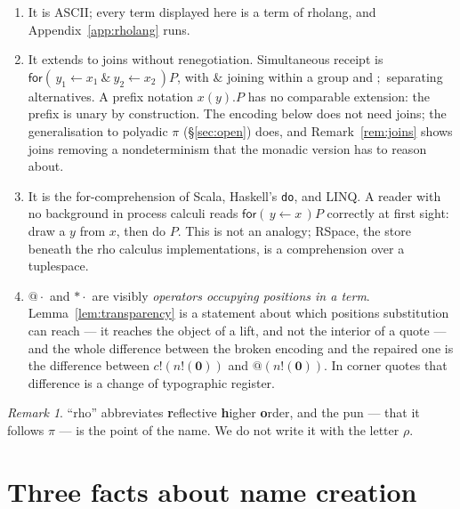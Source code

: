 \documentclass[11pt]{article}
\makeatletter
\theoremstyle{definition}
\theoremstyle{plain}
\theoremstyle{remark}
\newtheorem{remark}[definition]{Remark}
\newcommand{\quo}[1]{@#1}
\newcommand{\drp}[1]{{*}#1}
\newcommand{\inp}[3]{\mathsf{for}(\,#1 \leftarrow #2\,)#3}
\newcommand{\inpp}[5]{\mathsf{for}(\,#1 \leftarrow #2\ \&\ #3 \leftarrow #4\,)#5}
\newcommand{\out}[2]{#1!(#2)}
\newcommand{\nil}{\mathbf{0}}
\makeatother
\begin{document}
\begin{enumerate}[label=(\arabic*),leftmargin=2.2em]
\item It is ASCII; every term displayed here is a term of rholang, and
Appendix~\ref{app:rholang} runs.

\item It extends to joins without renegotiation. Simultaneous receipt is
$\inpp{y_1}{x_1}{y_2}{x_2}{P}$, with $\&$ joining within a group and $;$
separating alternatives. A prefix notation $x(y).P$ has no comparable
extension: the prefix is unary by construction. The encoding below does
not need joins; the generalisation to polyadic $\pi$
(\S\ref{sec:open}) does, and Remark~\ref{rem:joins} shows joins removing
a nondeterminism that the monadic version has to reason about.

\item It is the for-comprehension of Scala, Haskell's \texttt{do}, and
LINQ. A reader with no background in process calculi reads
$\inp{y}{x}{P}$ correctly at first sight: draw a $y$ from $x$, then do
$P$. This is not an analogy; RSpace, the store beneath the rho calculus
implementations, is a comprehension over a tuplespace.

\item $\quo{\cdot}$ and $\drp{\cdot}$ are visibly \emph{operators
occupying positions in a term}. Lemma~\ref{lem:transparency} is a
statement about which positions substitution can reach --- it reaches the
object of a lift, and not the interior of a quote --- and the whole
difference between the broken encoding and the repaired one is the
difference between $\out{c}{\out{n}{\nil}}$ and $\quo{(\out{n}{\nil})}$.
In corner quotes that difference is a change of typographic register.
\end{enumerate}

\begin{remark}
``rho'' abbreviates \textbf{r}eflective \textbf{h}igher \textbf{o}rder,
and the pun --- that it follows $\pi$ --- is the point of the name. We do
not write it with the letter $\rho$.
\end{remark}

\section{Three facts about name creation}\label{sec:facts}
\end{document}
